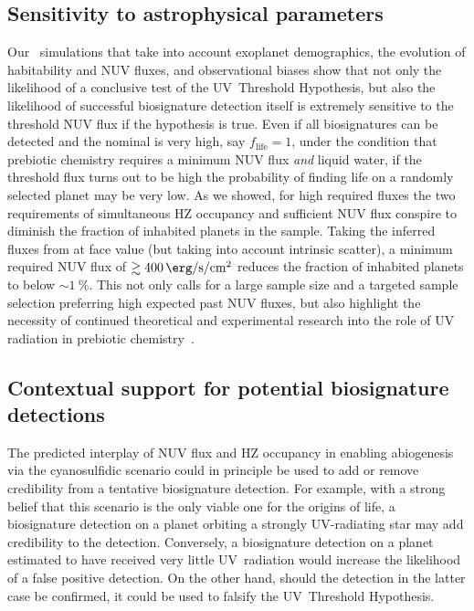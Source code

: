 \documentclass[twocolumn,twocolappendix,linenumbers]{aastex631}
\begin{document}
\subsection{Sensitivity to astrophysical parameters} %
Our \bioverse\ simulations that take into account exoplanet demographics, the evolution of habitability and \gls{NUV} fluxes, and observational biases show that not only the likelihood of a conclusive test of the UV~Threshold Hypothesis, but also the likelihood of successful biosignature detection itself is extremely sensitive to the threshold \gls{NUV} flux if the hypothesis is true.
Even if all biosignatures can be detected and the nominal  is very high, say $f_\mathrm{life} = 1$, under the condition that prebiotic chemistry requires a minimum \gls{NUV} flux \textit{and} liquid water, if the threshold flux turns out to be high the probability of finding life on a randomly selected planet may be very low.
As we showed, for high required fluxes the two requirements of simultaneous \gls{HZ} occupancy and sufficient \gls{NUV} flux conspire to diminish the fraction of inhabited planets in the sample.
Taking the inferred fluxes from \citet{Richey-Yowell2023} at face value (but taking into account intrinsic scatter), a minimum required \gls{NUV} flux of $\gtrsim\SI{400}{\erg\per\second\per\centi\meter\squared}$ reduces the fraction of inhabited planets to below $\sim\SI{1}{\percent}$.
This not only calls for a large sample size and a targeted sample selection preferring high expected past \gls{NUV} fluxes, but also highlight the necessity of continued theoretical and experimental research into the role of \gls{UV} radiation in prebiotic chemistry~\citep{Ranjan2017b,Rimmer2018,Rimmer2021}.





\subsection{Contextual support for potential biosignature detections} %
The predicted interplay of \gls{NUV} flux and \gls{HZ} occupancy in enabling abiogenesis via the cyanosulfidic scenario could in principle be used to add or remove credibility from a tentative biosignature detection.
For example, with a strong belief that this scenario is the only viable one for the origins of life, a biosignature detection on a planet orbiting a strongly UV-radiating star may add credibility to the detection.
Conversely, a biosignature detection on a planet estimated to have received very little UV~radiation would increase the likelihood of a false positive detection.
On the other hand, should the detection in the latter case be confirmed, it could be used to falsify the UV~Threshold Hypothesis.
\end{document}
